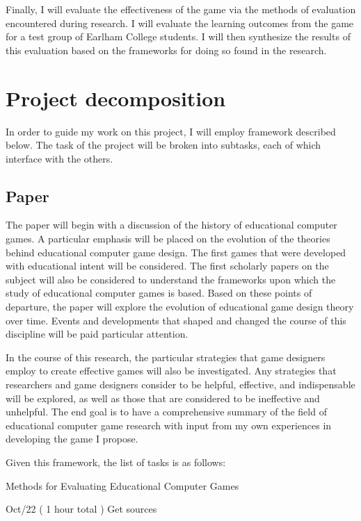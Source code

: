 \documentclass[11pt]{article}	%
\begin{document}
Finally, I will evaluate the effectiveness of the game via the methods of evaluation encountered during research.  I will evaluate the learning outcomes from the game for a test group of Earlham College students.  I will then synthesize the results of this evaluation based on the frameworks for doing so found in the research.


\section*{Project decomposition}

In order to guide my work on this project, I will employ framework described below.  The task of the project will be broken into subtasks, each of which interface with the others.


\subsection*{Paper}

The paper will begin with a discussion of the history of educational computer games.  A particular emphasis will be placed on the evolution of the theories behind educational computer game design.  The first games that were developed with educational intent will be considered.  The first scholarly papers on the subject will also be considered to understand the frameworks upon which the study of educational computer games is based.  Based on these points of departure, the paper will explore the evolution of educational game design theory over time.  Events and developments that shaped and changed the course of this discipline will be paid particular attention.

In the course of this research, the particular strategies that game designers employ to create effective games will also be investigated.  Any strategies that researchers and game designers consider to be helpful, effective, and indispensable will be explored, as well as those that are considered to be ineffective and unhelpful.  The end goal is to have a comprehensive summary of the field of educational computer game research with input from my own experiences in developing the game I propose.

Given this framework, the list of tasks is as follows:



Methods for Evaluating Educational Computer Games


Oct/22 ( 1 hour total ) Get sources
\end{document}
